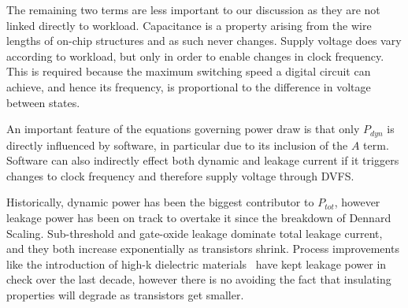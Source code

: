 The remaining two terms are less important to our discussion as they are not linked directly to workload. Capacitance is a property arising from the wire lengths of on-chip structures and as such never changes. Supply voltage does vary according to workload, but only in order to enable changes in clock frequency. This is required because the maximum switching speed a digital circuit can achieve, and hence its frequency, is proportional to the difference in voltage between states. 





An important feature of the equations governing power draw is that only $P_{dyn}$ is directly influenced by software, in particular due to its inclusion of the $A$ term. Software can also indirectly effect both dynamic and leakage current if it triggers changes to clock frequency and therefore supply voltage through DVFS.  

Historically, dynamic power has been the biggest contributor to $P_{tot}$, however leakage power has been on track to overtake it since the breakdown of Dennard Scaling.  Sub-threshold and gate-oxide leakage dominate total leakage current, and they both increase exponentially as transistors shrink. Process improvements like the introduction of high-k dielectric materials~\cite{jan:2009aa} have kept leakage power in check over the last decade, however there is no avoiding the fact that insulating properties will degrade as transistors get smaller.
